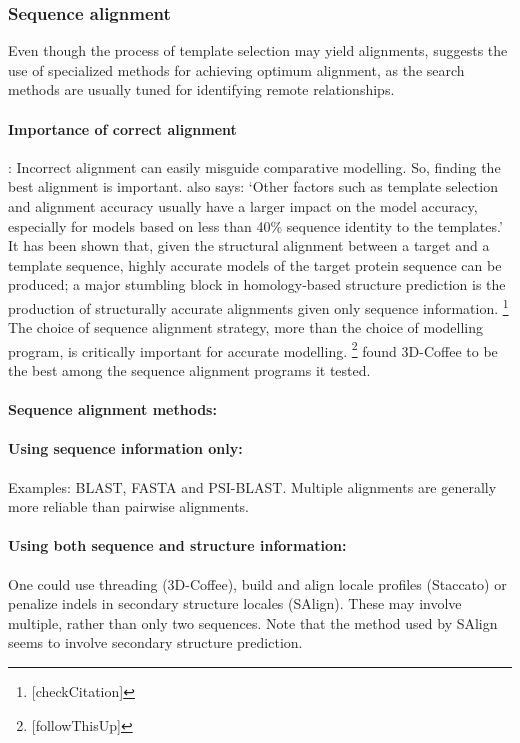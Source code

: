 \documentclass[10pt]{report}
\begin{document}
\subsubsection{Sequence alignment}

Even though the process of template selection may yield alignments, \cite{marti-renom2000com} suggests the use of specialized methods for achieving optimum alignment, as the search methods are usually tuned for identifying remote relationships.

\paragraph{Importance of correct alignment}: Incorrect alignment can easily misguide comparative modelling. So, finding the best alignment is important. \cite{marti-renom2000com} also says: `Other factors such as template selection and alignment accuracy usually have a larger impact on the model accuracy, especially for models based on less than 40\% sequence identity to the templates.' It has been shown that, given the structural alignment between a target and a template sequence, highly accurate models of the target protein sequence can be produced; a major stumbling block in homology-based structure prediction is the production of structurally accurate alignments given only sequence information. \cite{zhang05} \footnote{[checkCitation]} The choice of sequence alignment strategy, more than the choice of modelling program, is critically important for accurate modelling. \cite{venclovas05, dalton07}
\footnote{[followThisUp]} \cite{dalton07} found 3D-Coffee to be the best among the sequence alignment programs it tested.

\paragraph{Sequence alignment methods:}

\paragraph{Using sequence information only:} Examples: BLAST, FASTA and PSI-BLAST. Multiple alignments are generally more reliable than pairwise alignments. \cite{marti-renom2000com}

\paragraph{Using both sequence and structure information:} One could use threading (3D-Coffee), build and align locale profiles (Staccato) or penalize indels in secondary structure locales (SAlign). These may involve multiple, rather than only two sequences. Note that the method used by SAlign seems to involve secondary structure prediction.
\end{document}
